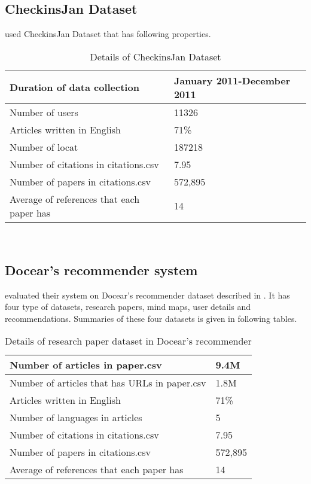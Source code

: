 \subsection{CheckinsJan Dataset}
\cite{N71} used CheckinsJan Dataset that has following properties.
\\
\begin{table}[!htbp] 
\centering
\footnotesize
\def\arraystretch{1.4}%
\centering
\begin{tabular}{|p{8cm}|p{2cm}|}
\hline
Duration of data collection & January 2011-December 2011
\\
\hline
Number of users & 11326
\\
\hline 
Articles written in English & 71\%
\\
\hline 
Number of locat & 187218
\\
\hline
Number of citations in citations.csv & 7.95
\\
\hline
Number of papers in citations.csv & 572,895
\\
\hline
Average of references that each paper has & 14
\\
\hline
\end{tabular}

\caption{Details of CheckinsJan Dataset}
\label{table:2}
\end{table}
\\
\subsection{Docear’s recommender system}
\cite{N56} evaluated their system on Docear’s recommender  dataset described in \cite{Docear's}. It has four type of datasets, research papers, mind maps, user details and recommendations. Summaries of these four datasets is given in following tables.
\\
\begin{table}[!htbp] 
\centering
\footnotesize
\def\arraystretch{1.4}%
\centering
\begin{tabular}{|p{8cm}|p{2cm}|}
\hline
Number of articles in paper.csv & 9.4M
\\
\hline
Number of articles that has URLs in paper.csv & 1.8M
\\
\hline 
Articles written in English & 71\%
\\
\hline 
Number of languages in articles & 5
\\
\hline
Number of citations in citations.csv & 7.95
\\
\hline
Number of papers in citations.csv & 572,895
\\
\hline
Average of references that each paper has & 14
\\
\hline
\end{tabular}

\caption{Details of research paper dataset in Docear's recommender}
\label{table:2}
\end{table}
\\


